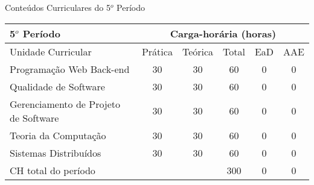 \begin{quadro}[ht!]
\centering
\caption{Conteúdos Curriculares do 5$^o$ Período}\label{qua:periodo5}
\begin{tabular}{|p{8.0cm}|c|c|c|c|c|}
\hline
\rowcolor{blue1} 5$^o$ Período & \multicolumn{5}{|c|}{\centering Carga-horária (horas)} \\ \hline
\rowcolor{blue1} Unidade Curricular & Prática & Teórica & Total & EaD & AAE \\ \hline
Programação Web Back-end & 30 & 30 & 60 & 0	&	0 \\	\hline
Qualidade de Software & 30 & 30 & 60 & 0	&	0 \\	\hline
Gerenciamento de Projeto de Software & 30 & 30 & 60 & 0	&	0 \\	\hline
Teoria da Computação & 30 & 30 & 60 & 0	&	0 \\	\hline
Sistemas Distribuídos & 30 & 30 & 60 & 0	&	0 \\	\hline
CH total do período & \multicolumn{2}{p{3.3cm}|}{\cellcolor{blue1}} & 300 & 0	&	0 \\ \hline
 \end{tabular} \end{quadro}